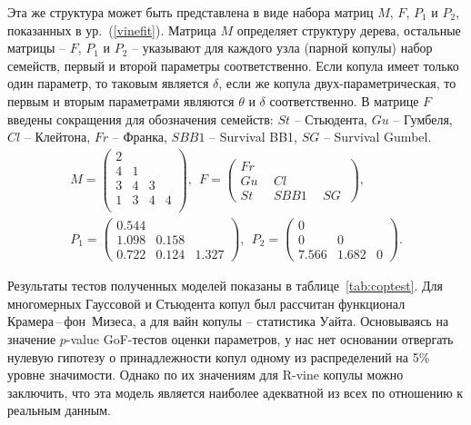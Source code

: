 Эта же структура может быть представлена в виде набора матриц $M$, $F$, $P_1$ и $P_2$, показанных в ур.~(\ref{vinefit}). 
Матрица $M$ определяет структуру дерева, остальные матрицы -- $F$, $P_1$ и $P_2$ -- указывают для каждого узла (парной копулы) набор семейств, первый и второй параметры соответственно. 
Если копула имеет только один параметр, то таковым является $\delta$, если же копула двух-параметрическая, то первым и вторым параметрами являются $\theta$ и $\delta$ соответственно.
В матрице $F$ введены сокращения для обозначения семейств: $St$ -- Стьюдента, $Gu$ -- Гумбеля, $Cl$ -- Клейтона, $Fr$ -- Франка, $SBB1$ -- Survival BB1, $SG$ -- Survival Gumbel.
%
\begin{gather} \label{vinefit}
    M = \left(
        \begin{array}{cccc}
        2 &   &   &   \\
        4 & 1 &   &   \\
        3 & 4 & 3 &   \\
        1 & 3 & 4 & 4 \\
        \end{array} \right), \ \
    F = \left(
        \begin{array}{lll}%
        Fr\ &\  &    \\
        Gu\ &\ Cl\ &   \\
        St\ &\ SBB1\ &\ SG\
        \end{array} \right),\\    
    P_1 = \left(
        \begin{array}{ccc}
        0.544 & & \\
        1.098 & 0.158 & \\
        0.722 & 0.124 & 1.327
        \end{array} \right), \ \
    P_2 = \left(
        \begin{array}{ccc}
        0 &  & \\
        0 & 0 & \\
        7.566 & 1.682 & 0
        \end{array} \right). \nonumber
\end{gather}

Результаты тестов полученных моделей показаны в таблице~\ref{tab:coptest}.
Для многомерных Гауссовой и Стьюдента копул был рассчитан функционал Крамера\,--\,фон~Мизеса, а для вайн копулы -- статистика Уайта.
Основываясь на значение $p$-value GoF-тестов оценки параметров, у нас нет основании отвергать нулевую гипотезу о принадлежности копул одному из распределений на 5\% уровне значимости.
Однако по их значениям для R-vine копулы можно заключить, что эта модель является наиболее адекватной из всех по отношению к реальным данным.

